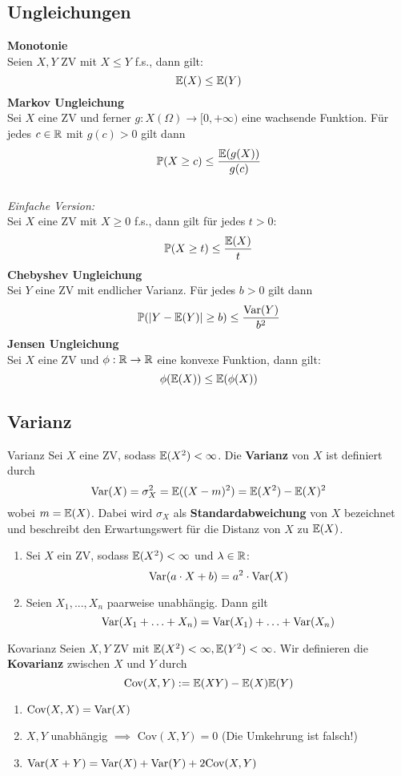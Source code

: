 \subsection{Ungleichungen}
\textbf{Monotonie}
\\Seien $X, Y$ ZV mit $X \leq Y$ f.s., dann gilt:
$$\mathbb{E}(X) \leq \mathbb{E}(Y)$$
\textbf{Markov Ungleichung}
\\Sei $X$ eine ZV und ferner $g: X(\Omega) \to [0, +\infty)$ eine wachsende Funktion. Für jedes $c \in \mathbb{R}$ mit $g(c) > 0$ gilt dann
$$\mathbb{P}(X \geq c) \leq \frac{\mathbb{E}(g(X))}{g(c)}$$
\\\textit{Einfache Version:}
\\Sei $X$ eine ZV mit $X\geq 0$ f.s., dann gilt für jedes $t > 0$:
$$\mathbb{P}(X \geq t) \leq \frac{\mathbb{E}(X)}{t}$$
\textbf{Chebyshev Ungleichung}
\\Sei $Y$ eine ZV mit endlicher Varianz. Für jedes $b > 0$ gilt dann
$$\mathbb{P}(|Y - \mathbb{E}(Y)| \geq b) \leq \frac{\text{Var}(Y)}{b^2}$$
\textbf{Jensen Ungleichung}
\\Sei $X$ eine ZV und $\phi: \mathbb{R} \to \mathbb{R}$ eine konvexe Funktion, dann gilt:
$$\phi(\mathbb{E}(X)) \leq \mathbb{E}(\phi(X))$$

\subsection{Varianz}
\begin{mainbox}{Varianz}
    Sei $X$ eine ZV, sodass $\mathbb{E}(X^2)<\infty$. Die \textbf{Varianz} von $X$ ist definiert durch
    $$\text{Var}(X) = \sigma_X^2 = \mathbb{E}((X - m)^2) = \mathbb{E}(X^2)-\mathbb{E}(X)^2$$
    wobei $m = \mathbb{E}(X)$. Dabei wird $\sigma_X$ als \textbf{Standardabweichung} von $X$ bezeichnet und beschreibt den Erwartungswert für die Distanz von $X$ zu $\mathbb{E}(X)$.
\end{mainbox}

\begin{enumerate}
    \item Sei $X$ ein ZV, sodass $\mathbb{E}(X^2)<\infty$ und $\lambda \in \mathbb{R}$:
    $$\text{Var}(a\cdot X + b) = a^2 \cdot \text{Var}(X)$$
    \item Seien $X_1, ..., X_n$ paarweise unabhängig. Dann gilt
    $$\text{Var}(X_1 + \ldots + X_n) = \text{Var}(X_1)+\ldots +\text{Var}(X_n)$$
\end{enumerate}

\begin{mainbox}{Kovarianz}
    Seien $X, Y$ ZV mit $\mathbb{E}(X^2)<\infty, \mathbb{E}(Y^2) < \infty$. Wir definieren die \textbf{Kovarianz} zwischen $X$ und $Y$ durch
    $$\text{Cov}(X,Y) := \mathbb{E}(XY) - \mathbb{E}(X)\mathbb{E}(Y)$$
\end{mainbox}
\begin{enumerate}
    \item $\text{Cov}(X,X) = \text{Var}(X)$
    \item $X, Y$ unabhängig $\implies$ $\text{Cov}(X, Y) = 0$ (Die Umkehrung ist falsch!)
    \item $\text{Var}(X+Y) = \text{Var}(X) + \text{Var}(Y) + 2\text{Cov}(X, Y)$
\end{enumerate}
